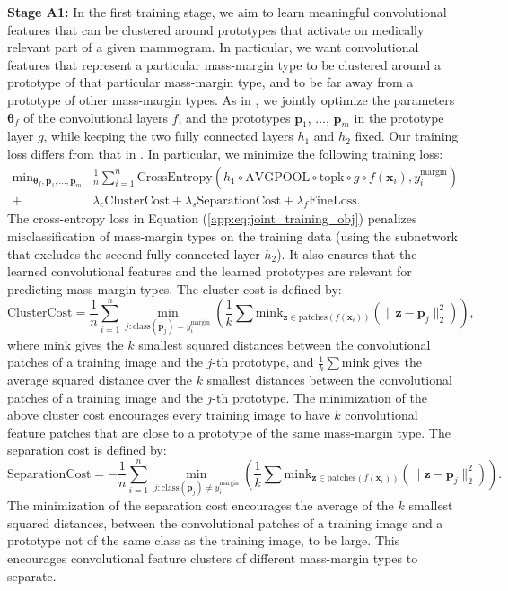 \documentclass[11pt]{article}
\begin{document}
\textbf{Stage A1:} In the first training stage, we aim to learn meaningful convolutional features that can be clustered around prototypes that activate on medically relevant part of a given mammogram. In particular, we want convolutional features that represent a particular mass-margin type to be clustered around a prototype of that particular mass-margin type, and to be far away from a prototype of other mass-margin types. As in \cite{PPNet}, we jointly optimize the parameters $\mathbf{\theta}_f$ of the convolutional layers $f$, and the prototypes $\mathbf{p}_1$, ..., $\mathbf{p}_m$ in the prototype layer $g$, while keeping the two fully connected layers $h_1$ and $h_2$ fixed. Our training loss differs from that in \cite{PPNet}. In particular, we minimize the following training loss:
\begin{align}
    \textrm{min}_{\mathbf{\theta}_f, \mathbf{p}_1, ..., \mathbf{p}_m} & \frac{1}{n} \sum_{i=1}^n \textrm{CrossEntropy}(h_1 \circ \textrm{AVGPOOL} \circ \textrm{topk} \circ g \circ f(\mathbf{x}_i), y^{\text{margin}}_i) \nonumber\\ +& \lambda_c \textrm{ClusterCost} + \lambda_s \textrm{SeparationCost} + \lambda_f \textrm{FineLoss}.
    \label{app:eq:joint_training_obj}
\end{align}
The cross-entropy loss in Equation (\ref{app:eq:joint_training_obj}) penalizes  misclassification of mass-margin types on the training data (using the subnetwork that excludes the second fully connected layer $h_2$). It also ensures that the learned convolutional features and the learned prototypes are relevant for predicting mass-margin types. The cluster cost is defined by:
\begin{equation}
\textrm{ClusterCost} = \frac{1}{n}\sum_{i=1}^{n} \min_{j:\text{class}(\mathbf{p}_j)=y^{\text{margin}}_i} \left(\frac{1}{k}\sum\mathrm{mink}_{\mathbf{z} \in \text{patches}(f(\mathbf{x}_i))}\left(\|\mathbf{z}-\mathbf{p}_j\|_2^2\right)\right), \label{app:eq:cluster_cost}
\end{equation}
where $\mathrm{mink}$ gives the $k$ smallest squared distances between the convolutional patches of a training image and the $j$-th prototype, and $\frac{1}{k}\sum\mathrm{mink}$ gives the average squared distance over the $k$ smallest distances between the convolutional patches of a training image and the $j$-th prototype. The minimization of the above cluster cost encourages every training image to have $k$ convolutional feature patches that are close to a prototype of the same mass-margin type. The separation cost is defined by:
\begin{equation}
\textrm{SeparationCost} = -\frac{1}{n}\sum_{i=1}^{n} \min_{j:\text{class}(\mathbf{p}_j) \neq y^{\text{margin}}_i} \left(\frac{1}{k}\sum\mathrm{mink}_{\mathbf{z} \in \text{patches}(f(\mathbf{x}_i))}\left(\|\mathbf{z}-\mathbf{p}_j\|_2^2\right)\right). \label{app:eq:separation_cost}
\end{equation}
The minimization of the separation cost encourages the average of the $k$ smallest squared distances, between the convolutional patches of a training image and a prototype not of the same class as the training image, to be large. This encourages convolutional feature clusters of different mass-margin types to separate.
\end{document}
